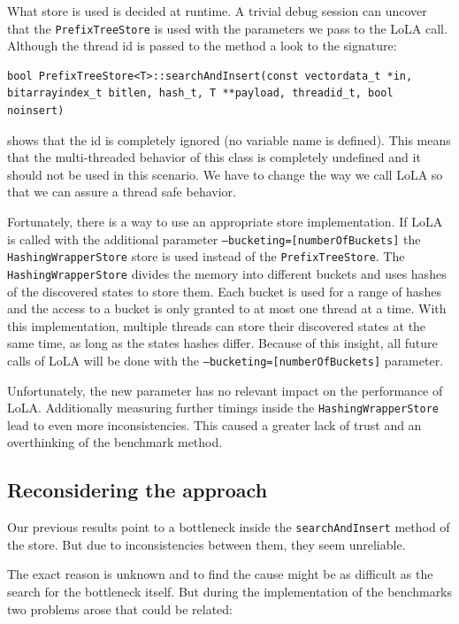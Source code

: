 What store is used is decided at runtime. A trivial debug session can uncover that the \texttt{PrefixTreeStore} is used with the parameters we pass to the LoLA call. Although the thread id is passed to the method a look to the signature:
\begin{lstlisting}
bool PrefixTreeStore<T>::searchAndInsert(const vectordata_t *in, bitarrayindex_t bitlen, hash_t, T **payload, threadid_t, bool noinsert)
\end{lstlisting}
shows that the id is completely ignored (no variable name is defined). This means that the multi-threaded behavior of this class is completely undefined and it should not be used in this scenario. We have to change the way we call LoLA so that we can assure a thread safe behavior.

Fortunately, there is a way to use an appropriate store implementation. If LoLA is called with the additional parameter \texttt{--bucketing=[numberOfBuckets]} the \texttt{Hashing\-Wrapper\-Store} store is used instead of the \texttt{PrefixTreeStore}. The \texttt{Hashing\-Wrapper\-Store} divides the memory into different buckets and uses hashes of the discovered states to store them. Each bucket is used for a range of hashes and the access to a bucket is only granted to at most one thread at a time. With this implementation, multiple threads can store their discovered states at the same time, as long as the states hashes differ. Because of this insight, all future calls of LoLA will be done with the \texttt{--bucketing=[numberOfBuckets]} parameter.

Unfortunately, the new parameter has no relevant impact on the performance of LoLA. Additionally measuring further timings inside the \texttt{Hashing\-Wrapper\-Store} lead to even more inconsistencies. This caused a greater lack of trust and an overthinking of the benchmark method.

\subsection{Reconsidering the approach}
Our previous results point to a bottleneck inside the \texttt{searchAndInsert} method of the store. But due to inconsistencies between them, they seem unreliable.

The exact reason is unknown and to find the cause might be as difficult as the search for the bottleneck itself. But during the implementation of the benchmarks two problems arose that could be related:

